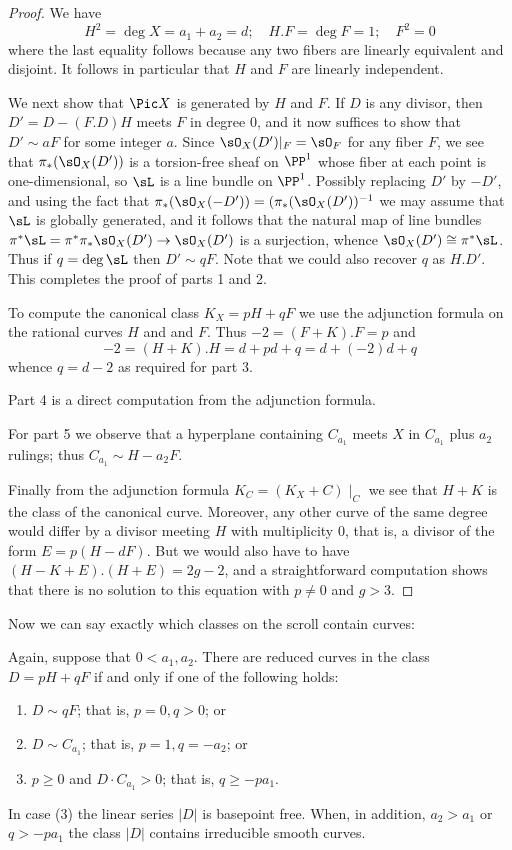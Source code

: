 \begin{proof}
We have 
$$
H^2 = \deg X = a_1+a_2 = d; \quad H.F = \deg F = 1; \quad F^2 = 0
$$
where the last equality follows because any two fibers are linearly equivalent and disjoint.
It follows in particular that $H$ and $F$ are linearly independent.

We next show that $\Pic X$ is generated by $H$ and $F$. If $D$ is any divisor,
then $D' = D - (F.D)H$ meets $F$ in degree 0, and it now suffices to show that $D'\sim aF$ for
some integer $a$.
Since $\sO_X(D')|_F = \sO_F$ for any fiber $F$, we see that
$\pi_*(\sO_X(D'))$ is a torsion-free sheaf on $\PP^1$ whose fiber at each point is one-dimensional, 
so $\sL$ is a line bundle on $\PP^1$.  Possibly replacing $D'$ by $-D'$, and using the fact that
$\pi_*(\sO_X(-D')) = (\pi_*(\sO_X(D'))^{-1}$ we may assume that $\sL$ is globally generated, and it follows that  the natural map of line bundles $\pi^*\sL = \pi^*\pi_* \sO_X(D') \to \sO_X(D') $ is a surjection, whence 
$\sO_X(D') \cong \pi^*\sL$. Thus if $q = \deg \sL$ then
$D' \sim qF$. Note that we could also recover $q$ as $H.D'$. This completes the proof of parts
1 and 2.

To compute the canonical class $K_X = pH+qF$ we use the adjunction formula on the rational curves
$H$ and and $F$. Thus $-2 = (F+K).F = p $ and 
$$
-2 = (H+K).H = d + pd+q = d + (-2)d+q
$$
whence $q = d-2$ as required for part 3.
 
 Part 4 is a direct computation from the adjunction formula.
 
For part 5 we observe that a hyperplane containing $C_{a_1}$ meets $X$ in $C_{a_1}$ plus
$a_2$ rulings; thus $C_{a_1}\sim H-a_2F$.

Finally from the adjunction formula $K_C = (K_X+C)\mid_C$ we see that $H+K$ is the class of
the canonical curve. Moreover, any other curve of the same degree would differ by
a divisor meeting $H$ with multiplicity 0, that is, a divisor of the form $E = p(H-dF)$.
But we would also have to have $(H-K+E).(H+E) = 2g-2$, and a straightforward
computation shows that there is no solution to this equation with $p\neq 0$ and $g>3$.
\end{proof}

Now we can say exactly which classes on the scroll contain curves:

\begin{theorem}\label{where are the curves?} Again, suppose that $0<a_{1},a_{2}$.
There are reduced  curves in the class $D = pH+qF$ if and only if one of the following holds:

\begin{enumerate}
\item $D\sim qF$; that is, $p=0, q>0$; or
\item $D\sim C_{a_{1}}$; that is, $p=1, q=-a_{2}$; or
\item $p\geq 0$ and $D\cdot C_{a_{1}}> 0$; that is, $q \geq -pa_1.$
\end{enumerate}
In case (3) the linear series $|D|$ is basepoint free. When, in addition, $a_2>a_1$ or $q>-pa_1$ the class $|D|$ contains irreducible smooth curves.
\end{theorem}

